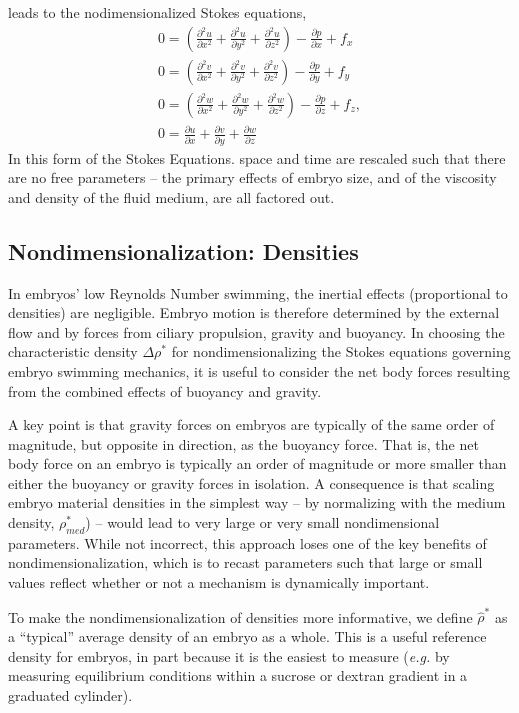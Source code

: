 \documentclass[10pt,a4paper]{article}
\def\non{\nonumber}
\def\p{\partial}
\begin{document}
leads to the nodimensionalized Stokes equations,
\begin{eqnarray}\label{Stokes2}
	0 = \left( \frac{\p^2 u}{\p x^2}+\frac{\p^2 u}{\p y^2}+\frac{\p^2 u}{\p z^2} \right) - \frac{\p p}{\p x} + f_x \non \\
	0 = \left( \frac{\p^2 v}{\p x^2}+\frac{\p^2 v}{\p y^2}+\frac{\p^2 v}{\p z^2} \right) - \frac{\p p}{\p y} + f_y \non \\
	0 = \left( \frac{\p^2 w}{\p x^2}+\frac{\p^2 w}{\p y^2}+\frac{\p^2 w}{\p z^2} \right) - \frac{\p p}{\p z} + f_z , \non \\
	0 =  \frac{\p u}{\p {x}}+\frac{\p v}{\p {y}}+\frac{\p w}{\p {z}}
\end{eqnarray}
In this form of the Stokes Equations. space and time are rescaled such that there are no free parameters -- the primary effects of embryo size, and of the viscosity and density of the fluid medium, are all factored out.  

\subsection{Nondimensionalization: Densities}
In embryos' low Reynolds Number swimming, the inertial effects (proportional to densities) are negligible.
Embryo motion is therefore determined by the external flow and by forces from ciliary propulsion, gravity and buoyancy.
In choosing the characteristic density $\Delta \rho^*$ for nondimensionalizing the Stokes equations governing embryo swimming mechanics, it is useful to consider the net body forces resulting from the combined effects of buoyancy and gravity. 

A key point is that gravity forces on embryos are typically of the same order of magnitude, but opposite in direction, as the buoyancy force.
That is, the net body force on an embryo is typically an order of magnitude or more smaller than either the buoyancy or gravity forces in isolation.
A consequence is that scaling embryo material densities in the simplest way -- by normalizing with the medium density, $\rho^*_{med}$) -- would lead to very large or very small nondimensional parameters.
While not incorrect, this approach loses one of the key benefits of nondimensionalization, which is to recast parameters such that large or small values reflect whether or not a mechanism is dynamically important.

To make the nondimensionalization of densities more informative, we define $\hat{\rho}^*$ as a ``typical'' average density of an embryo as a whole.
This is a useful reference density for embryos, in part because it is the easiest to measure (\textit{e.g.} by measuring equilibrium conditions within a sucrose or dextran gradient in a graduated cylinder).
\end{document}
